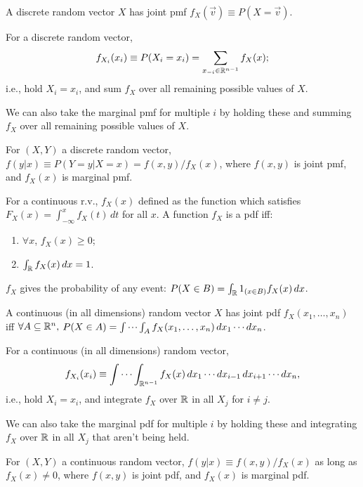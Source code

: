 \documentclass[8pt,letterpaper, landscape]{extarticle} %
\begin{document}
\begin{multicols}{3}
\begin{description}
A discrete random vector $ X $ has joint pmf $ f_X(\vec{v}) \equiv P (X = \vec{v}) $.

 For a discrete random vector,
$$ f_{X_i} (x_i) \equiv P(X_i = x_i) = \sum_{x_{-i} \in \mathbb{R}^{n-1}} f_X (x) ; $$
i.e., hold $ X_i = x_i $, and sum $ f_X $ over all remaining possible values of $ X $.

We can also take the marginal pmf for multiple $ i $ by holding these and summing $ f_X $ over all remaining possible values of $ X $.

 For $ (X,Y) $ a discrete random vector, $ f(y|x) \equiv P(Y = y | X = x) = f(x,y)/f_X(x) $, where $ f(x,y) $ is joint pmf, and $ f_X(x) $ is marginal pmf.

 For a continuous r.v., $ f_X (x) $ defined as the function which satisfies $ F_X(x) = \int_{-\infty}^{x} f_X(t) \, dt $ for all $ x $. A function $ f_X $ is a pdf iff:
\begin{enumerate}
\item $ \forall x $, $ f_X(x) \geq 0 $;
\item $ \int_{\mathbb{R}} f_X(x) \, dx = 1 $.
\end{enumerate}
$ f_X $ gives the probability of any event: $ P (X \in B) = \int_{\mathbb{R}} 1_{(x \in B)} f_X(x) \, dx $.

A continuous (in all dimensions) random vector $ X $ has joint pdf $ f_X(x_1, \dotsc, x_n) $ iff $ \forall A \subseteq \mathbb{R}^n, $ $ P(X \in A) = \idotsint_A f_X(x_1, \dotsc, x_n) \, dx_1 \dotsm dx_n $.

 For a  continuous (in all dimensions) random vector,
$$ f_{X_i} (x_i) \equiv \idotsint_{\mathbb{R}^{n-1}} f_X (x) \, dx_1 \dotsm dx_{i-1} \, dx_{i+1} \dotsm dx_n, $$
i.e., hold $ X_i = x_i $, and integrate $ f_X $ over $ \mathbb{R} $ in all $ X_j $ for $ i \neq j $.

We can also take the marginal pdf for multiple $ i $ by holding these and integrating $ f_X $ over $ \mathbb{R} $ in all $ X_j $ that aren't being held.

 For $ (X,Y) $ a continuous random vector, $ f(y|x) \equiv f(x,y)/f_X(x) $ as long as $ f_X(x) \neq 0 $, where $ f(x,y) $ is joint pdf, and $ f_X(x) $ is marginal pdf.


\end{description}
\end{multicols}
\end{document}
